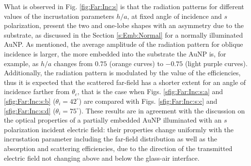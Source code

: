 What is observed in Fig. \ref{fig:Far:Inc:s} is that the radiation patterns for different values of the incrustation parameters $h/a$, at fixed angle of incidence and $s$ polarization, present the two and one-lobe shapes with an asymmetry due to the substrate, as discussed in the Section \ref{s:Emb:Normal} for a normally illuminated AuNP. As mentioned, the average amplitude of the radiation pattern for oblique incidence is larger, the more embedded into the substrate  the AuNP is, for example, as $h/a$ changes from $0.75$ (orange curves) to $-0.75$ (light purple curves). Additionally, the radiation pattern is modulated by the value of the efficiencies,  thus it is expected that the scattered far-field has a shorter extent for an angle of incidence farther from $\theta_c$, that is the case when Figs. \ref{sfig:Far:Inc:s:a} and  \ref{sfig:Far:Inc:s:b} ($\theta_i =42^\circ$) are compared with Figs. \ref{sfig:Far:Inc:s:c} and  \ref{sfig:Far:Inc:s:d} ($\theta_i =75^\circ$). These results are in agreement with the discussion on the optical properties of a partially embedded AuNP  illuminated with an $s$ polarization incident electric field: their properties change uniformly with the incrustation parameter including the far-field distribution as well as the absorption and scattering efficiencies, due to the direction of the transmitted electric field not changing above and below the glass-air interface.

